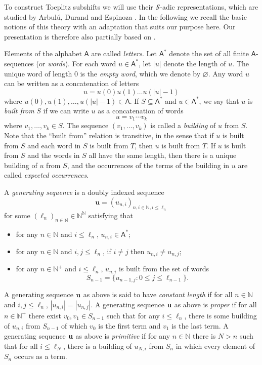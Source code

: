 \documentclass{amsart}
\theoremstyle{definition}
\theoremstyle{problem}
\theoremstyle{remark}
\numberwithin{equation}{section}
\begin{document}
To construct Toeplitz subshifts we will use their $\mathcal{S}$-adic representations, which are studied by Arbul\'{u}, Durand and Espinoza \cite{ADE}. In the following we recall the basic notions of this theory with an adaptation that suits our purpose here. Our presentation is therefore also partially based on \cite{GLPS}. 

Elements of the alphabet $\mathsf{A}$ are called {\em letters}. Let $\mathsf{A}^*$ denote the set of all finite $\mathsf{A}$-sequences (or {\em words}). For each word $u\in \mathsf{A}^*$, let $|u|$ denote the length of $u$. The unique word of length $0$ is the {\em empty word}, which we denote by $\varnothing$. Any word $u$ can be written as a concatenation of letters
$$ u=u(0)u(1)\dots u(|u|-1) $$
where $u(0), u(1), \dots, u({|u|-1})\in\mathsf{A}$. 
If $S\subseteq \mathsf{A}^*$ and $u\in \mathsf{A}^*$, we say that $u$ is {\em built from} $S$ if we can write $u$ as a concatenation of words
$$ u=v_1\cdots v_k $$
where $v_1,\dots, v_k\in S$. The sequence $(v_1, \dots, v_k)$ is called a {\em building} of $u$ from $S$. Note that the ``built from'' relation is transitive, in the sense that if $u$ is built from $S$ and each word in $S$ is built from $T$, then $u$ is built from $T$. If $u$ is built from $S$ and the words in $S$ all have the same length, then there is a unique building of $u$ from $S$, and the occurrences of the terms of the building in $u$ are called {\em expected occurrences}. 

A {\em generating sequence} is a doubly indexed sequence $${\mathbf u}=(u_{n, i})_{n,i\in\mathbb{N}, i\leq \ell_n}$$ for some $(\ell_n)_{n\in\mathbb{N}}\in \mathbb{N}^\mathbb{N}$ satisfying that
\begin{itemize}
\item for any $n\in\mathbb{N}$ and $i\leq \ell_n$, $u_{n,i}\in \mathsf{A}^*$;
\item for any $n\in \mathbb{N}$ and $i,j\leq \ell_n$, if $i\neq j$ then $u_{n,i}\neq u_{n,j}$;
\item for any $n\in \mathbb{N}^+$ and $i\leq \ell_n$, $u_{n,i}$ is built from the set of words
$$S_{n-1}=\{ u_{n-1, j}\colon 0\leq j\leq \ell_{n-1}\}.$$
\end{itemize}
A generating sequence ${\bf u}$ as above is said to have {\em constant length} if for all $n\in\mathbb{N}$ and $i, j\leq \ell_n$, $|u_{n,i}|=|u_{n,j}|$. A generating sequence ${\bf u}$ as above is {\em proper} if for all $n\in\mathbb{N}^+$ there exist $v_0, v_1\in S_{n-1}$ such that for any $i\leq\ell_n$, there is some building of $u_{n,i}$ from $S_{n-1}$ of which $v_0$ is the first term and $v_1$ is the last term. A generating sequence ${\bf u}$ as above is {\em primitive} if for any $n\in\mathbb{N}$ there is $N>n$ such that for all $i\leq \ell_N$, there is a building of $u_{N,i}$ from $S_n$ in which every element of $S_n$ occurs as a term. 
\end{document}
